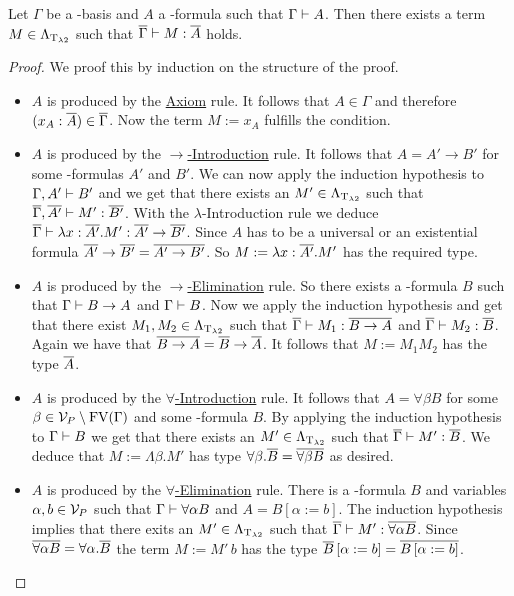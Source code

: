\begin{lemma}\label{lem.4.2}
Let $\Gamma$ be a \SysP-basis and $A$ a \SysP-formula such that $\Gamma\vdash A$. Then there exists a term $M\in\Lambda_{\text{T}_{\lambda2}}$ such that $\overline{\Gamma}\vdash M:\overline{A}$ holds.
\end{lemma}
\begin{proof}
We proof this by induction on the structure of the proof. %

\begin{itemize}
	\item[] $A$ is produced by the \underline{Axiom} rule. It follows that $A\in\Gamma$ and therefore $(x_A:\overline{A})\in\overline{\Gamma}$. Now the term $M:=x_A$ fulfills the condition.
	
	\item[] $A$ is produced by the \underline{$\rightarrow$-Introduction} rule. It follows that $A=A'\to B'$ for some \SysP-formulas $A'$ and $B'$. We can now apply the induction hypothesis to $\Gamma,A'\vdash B'$ and we get that there exists an $M'\in\Lambda_{\text{T}_{\lambda2}}$ such that $\overline{\Gamma},\overline{A'}\vdash M':\overline{B'}$. With the $\lambda$-Introduction rule we deduce $\overline{\Gamma}\vdash \lambda x:\overline{A'}.M':\overline{A'}\to\overline{B'}$. Since $A$ has to be a universal or an existential formula $\overline{A'}\to\overline{B'}=\overline{A'\to B'}$. So $M:=\lambda x:\overline{A'}.M'$ has the required type.
	
	\item[] $A$ is produced by the \underline{$\rightarrow$-Elimination} rule. So there exists a \SysP-formula $B$ such that $\Gamma\vdash B\to A$ and $\Gamma\vdash B$. Now we apply the induction hypothesis and get that there exist $M_1,M_2\in\Lambda_{\text{T}_{\lambda2}}$ such that $\overline{\Gamma}\vdash M_1:\overline{B\to A}$ and $\overline{\Gamma}\vdash M_2:\overline{B}$. Again we have that $\overline{B\to A}=\overline{B}\to\overline{A}$. It follows that $M:=M_1M_2$ has the type $\overline{A}$.
	
	\item[] $A$ is produced by the \underline{$\forall$-Introduction} rule. It follows that $A=\forall\beta B$ for some $\beta\in\mathcal{V}_P\setminus\text{FV}(\Gamma)$ and some \SysP-formula $B$. By applying the induction hypothesis to $\Gamma\vdash B$ we get that there exists an $M'\in\Lambda_{\text{T}_{\lambda2}}$ such that $\overline{\Gamma}\vdash M':\overline{B}$. We deduce that $M:=\Lambda\beta.M'$ has type $\forall\beta.\overline{B}=\overline{\forall\beta B}$ as desired. 
	
	\item[] $A$ is produced by the \underline{$\forall$-Elimination} rule. There is a \SysP-formula $B$ and variables $\alpha,b\in\mathcal{V}_P$ such that $\Gamma\vdash\forall\alpha B$ and $A=B\left[\alpha:=b\right]$. The induction hypothesis implies that there exits an $M'\in\Lambda_{\text{T}_{\lambda2}}$ such that $\overline{\Gamma}\vdash M':\overline{\forall\alpha B}$. Since $\overline{\forall\alpha B}=\forall\alpha.\overline{B}$ the term $M:=M'\,b$ has the type $\overline{B}\left[\alpha:=b\right]=\overline{B\left[\alpha:=b\right]}$.
\end{itemize}
\end{proof}

